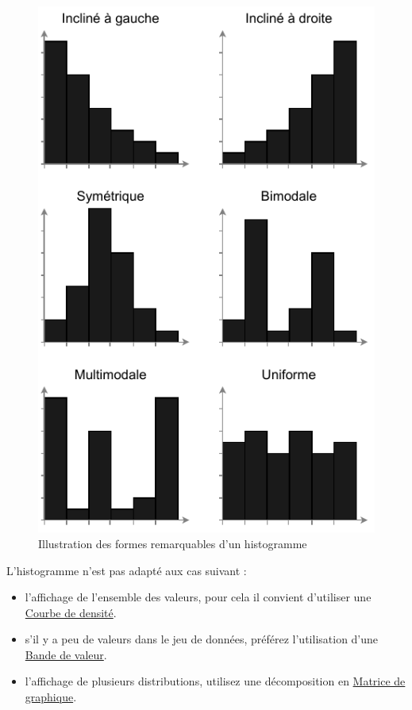 \documentclass[a4paper,12pt]{article}
\begin{document}
\begin{multicols}{2}
\begin{figure}[H]
\centering
\includegraphics[width=.9\linewidth]{./img/histogram-patterns.pdf}
\caption{\label{fig:orgaa376fb}Illustration des formes remarquables d'un histogramme}
\end{figure}

L'histogramme n'est pas adapté aux cas suivant :
\begin{itemize}
\item l'affichage de l'ensemble des valeurs, pour cela il convient d'utiliser une \hyperref[sec:org1dfdfd2]{Courbe de densité}. \autocite{wilkeVisualizingDistributionsHistograms2019}
\item s'il y a peu de valeurs dans le jeu de données, \autocite{weissgerberBarLineGraphs2015} préférez l'utilisation d'une \hyperref[sec:orgf421f00]{Bande de valeur}.
\item l'affichage de plusieurs distributions,\autocite{wilkeVisualizingDistributionsHistograms2019} utilisez une décomposition en \hyperref[sec:org44b2ac7]{Matrice de graphique}.
\end{itemize}

\end{multicols}
\end{document}
